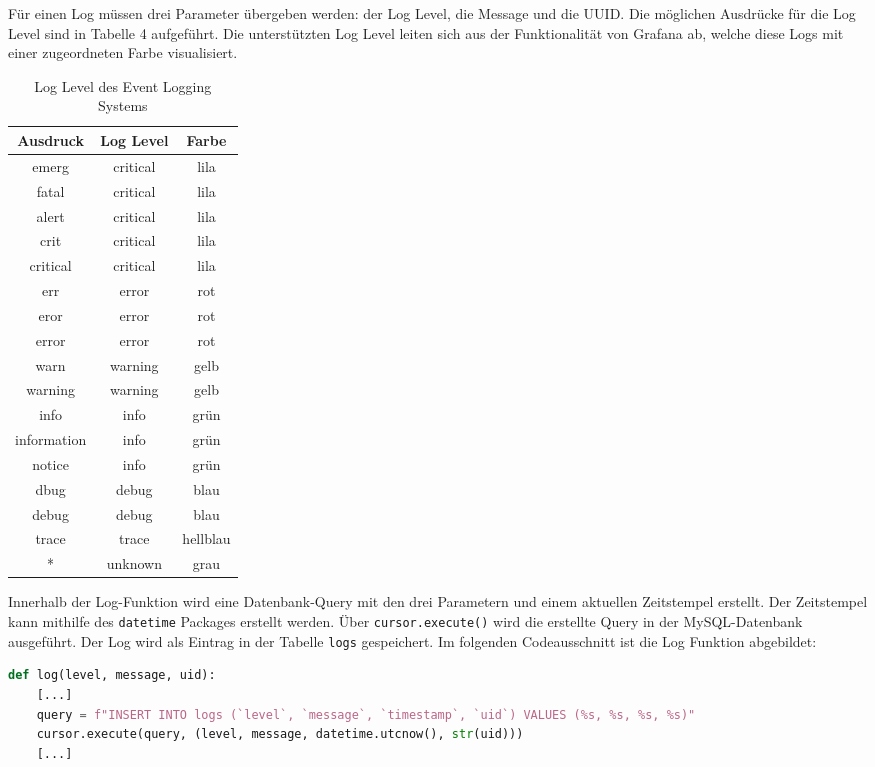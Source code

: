 Für einen Log müssen drei Parameter übergeben werden: der Log Level, die Message und die UUID. Die möglichen Ausdrücke für die Log Level sind in Tabelle 4 aufgeführt. Die unterstützten Log Level leiten sich aus der Funktionalität von Grafana ab, welche diese Logs mit einer zugeordneten Farbe visualisiert.

\begin{table}[H]
\centering
\begin{tabular}{c|c|c}
\textbf{Ausdruck} & \textbf{Log Level} & \textbf{Farbe}\\
\hline
emerg & critical & lila\\
fatal & critical & lila\\
alert & critical & lila\\
crit & critical & lila\\
critical & critical & lila\\
err & error & rot\\
eror & error & rot\\
error & error & rot\\
warn & warning & gelb\\
warning & warning & gelb\\
info & info & grün\\
information & info & grün\\
notice & info & grün\\
dbug & debug & blau\\
debug & debug & blau\\
trace & trace & hellblau\\
* & unknown & grau
\end{tabular}
\caption{Log Level des Event Logging Systems}
\end{table}

Innerhalb der Log-Funktion wird eine Datenbank-Query mit den drei Parametern und einem aktuellen Zeitstempel erstellt. Der Zeitstempel kann mithilfe des \texttt{datetime} Packages erstellt werden. Über \texttt{cursor.execute()} wird die erstellte Query in der MySQL-Datenbank ausgeführt. Der Log wird als Eintrag in der Tabelle \texttt{logs} gespeichert. Im folgenden Codeausschnitt ist die Log Funktion abgebildet:

\begin{lstlisting}[language=Python, caption={Erstellung eines Logs}]
def log(level, message, uid):
    [...]
    query = f"INSERT INTO logs (`level`, `message`, `timestamp`, `uid`) VALUES (%s, %s, %s, %s)"
    cursor.execute(query, (level, message, datetime.utcnow(), str(uid)))
    [...]
\end{lstlisting}

